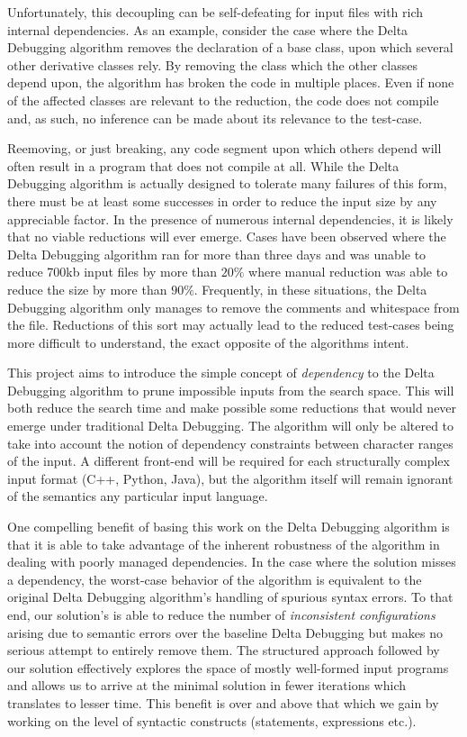 \documentclass[preprint]{acm_proc_article-sp}
\begin{document}
Unfortunately, this decoupling can be self-defeating for input files with rich
internal dependencies. As an example, consider the case where the Delta
Debugging algorithm removes the declaration of a base class, upon which several
other derivative classes rely. By removing the class which the other classes
depend upon, the algorithm has broken the code in multiple places. Even if none
of the affected classes are relevant to the reduction, the code does not compile
and, as such, no inference can be made about its relevance to the test-case.

Reemoving, or just breaking, any code segment upon which others depend will
often result in a program that does not compile at all. While the Delta
Debugging algorithm is actually designed to tolerate many failures of this form,
there must be at least some successes in order to reduce the input size by any
appreciable factor. In the presence of numerous internal dependencies, it is
likely that no viable reductions will ever emerge. Cases have been observed
\citep{trex} where the Delta Debugging algorithm ran for more than three days
and was unable to reduce 700kb input files by more than $20 \%$ where manual
reduction was able to reduce the size by more than $90 \%$. Frequently, in
these situations, the Delta Debugging algorithm only manages to remove the
comments and whitespace from the file. Reductions of this sort may actually lead
to the reduced test-cases being more difficult to understand, the exact opposite
of the algorithms intent.

This project aims to introduce the simple concept of \emph{dependency} to the
Delta Debugging algorithm to prune impossible inputs from the search space.
This will both reduce the search time and make possible some reductions that
would never emerge under traditional Delta Debugging. The algorithm will only be
altered to take into account the notion of dependency constraints between
character ranges of the input. A different front-end will be required for each
structurally complex input format (C++, Python, Java), but the algorithm itself
will remain ignorant of the semantics any particular input language.

One compelling benefit of basing this work on the Delta Debugging algorithm is
that it is able to take advantage of the inherent robustness of the algorithm
in dealing with poorly managed dependencies. In the case where the solution
misses a dependency, the worst-case behavior of the algorithm is equivalent to
the original Delta Debugging algorithm's handling of spurious syntax errors.
To that end, our solution's is able to reduce the number of \emph{inconsistent
configurations} \citep{zeller99} arising due to semantic errors over the
baseline Delta Debugging but makes no serious attempt to entirely remove them.
The structured approach followed by our solution effectively explores the space
of mostly well-formed input programs and allows us to arrive at the minimal
solution in fewer iterations which translates to lesser time. This benefit is
over and above that which we gain by working on the level of syntactic
constructs (statements, expressions etc.).
\end{document}
